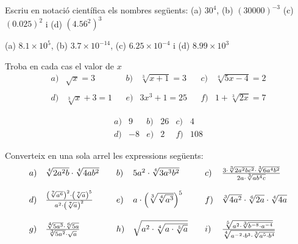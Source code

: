 \begin{exercici}
Escriu en notació científica els nombres següents:
(a) $30^{4}$, (b) $(30000)^{-3}$ (c) $(0.025)^{2}$ i (d) $(4.56^{2})^{3}$

\end{exercici}

\begin{indicacio}
(a) $8.1\times 10^{5}$, (b) $3.7\times 10^{-14}$, (c) $%
6.25\times 10^{-4}$ i (d) $8.99\times 10^{3}$
\end{indicacio}

\begin{exercici}
Troba en cada cas el valor de $x$%
\[
\begin{array}{llllllll}
a) & \sqrt{x}=3 &  & b) & \sqrt[3]{x+1}=3 &  & c) & \sqrt[4]{5x-4}=2 \\ 
&  &  &  &  &  &  &  \\ 
d) & \sqrt[3]{x}+3=1 &  & e) & 3x^{3}+1=25 &  & f) & 1+\sqrt[3]{2x}=7%
\end{array}%
\]

\end{exercici}

\begin{indicacio}
%
\[
\begin{array}{cccccc}
a) & 9 & b) & 26 & c) & 4 \\ 
d) & -8 & e) & 2 & f) & 108%
\end{array}%
\]
\end{indicacio}

\begin{exercici}
Converteix en una sola arrel les expressions següents:%
\[
\begin{array}{llllllll}
a) & \sqrt[4]{2a^{2}b}\cdot \sqrt[4]{4ab^{2}} &  & b) & 5a^{2}\cdot \sqrt[4]{%
3a^{3}b^{2}} &  & c) & \frac{3\cdot \sqrt[3]{2a^{2}bc^{2}}\cdot \sqrt[3]{%
6a^{4}b^{2}}}{2a\cdot \sqrt[3]{ab^{4}c}} \\ 
&  &  &  &  &  &  &  \\ 
d) & \frac{\left( \sqrt[7]{a^{6}}\right) ^{2}\cdot \left( \sqrt[7]{a}\right)
^{5}}{a^{2}\cdot \left( \sqrt[7]{a}\right) ^{2}} &  & e) & a\cdot \left( 
\sqrt[3]{\sqrt[4]{a^{3}}}\right) ^{5} &  & f) & \sqrt[3]{4a^{2}}\cdot \sqrt[6%
]{2a}\cdot \sqrt[4]{4a} \\ 
&  &  &  &  &  &  &  \\ 
g) & \frac{\sqrt[4]{5a^{3}}\cdot \sqrt[6]{5a}}{\sqrt[3]{5a^{2}}\cdot \sqrt{a}%
} &  & h) & \sqrt{a^{2}\cdot \sqrt[4]{a\cdot \sqrt[5]{a}}} &  & i) & \frac{%
\sqrt[5]{a^{2}\cdot \sqrt[3]{b^{-8}\cdot a^{-4}}}}{\sqrt[4]{a^{-2}\cdot
b^{3}\cdot \sqrt[3]{a^{5}\cdot b^{4}}}}%
\end{array}%
\]

\end{exercici}

